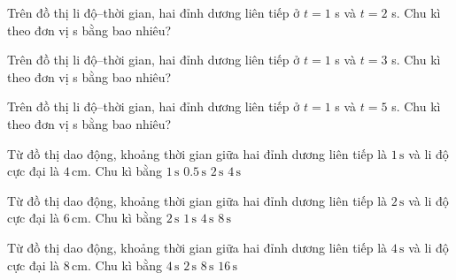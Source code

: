 \begin{ex}
Trên đồ thị li độ–thời gian, hai đỉnh dương liên tiếp ở $t=1$ s và $t=2$ s. Chu kì theo đơn vị s bằng bao nhiêu?
\end{ex}

\begin{ex}
Trên đồ thị li độ–thời gian, hai đỉnh dương liên tiếp ở $t=1$ s và $t=3$ s. Chu kì theo đơn vị s bằng bao nhiêu?
\end{ex}

\begin{ex}
Trên đồ thị li độ–thời gian, hai đỉnh dương liên tiếp ở $t=1$ s và $t=5$ s. Chu kì theo đơn vị s bằng bao nhiêu?
\end{ex}

\begin{ex}
Từ đồ thị dao động, khoảng thời gian giữa hai đỉnh dương liên tiếp là $1\,\text{s}$ và li độ cực đại là $4\,\text{cm}$. Chu kì bằng
\choice
{\True $1\,\text{s}$}
{$0.5\,\text{s}$}
{$2\,\text{s}$}
{$4\,\text{s}$}
\end{ex}

\begin{ex}
Từ đồ thị dao động, khoảng thời gian giữa hai đỉnh dương liên tiếp là $2\,\text{s}$ và li độ cực đại là $6\,\text{cm}$. Chu kì bằng
\choice
{\True $2\,\text{s}$}
{$1\,\text{s}$}
{$4\,\text{s}$}
{$8\,\text{s}$}
\end{ex}

\begin{ex}
Từ đồ thị dao động, khoảng thời gian giữa hai đỉnh dương liên tiếp là $4\,\text{s}$ và li độ cực đại là $8\,\text{cm}$. Chu kì bằng
\choice
{\True $4\,\text{s}$}
{$2\,\text{s}$}
{$8\,\text{s}$}
{$16\,\text{s}$}
\end{ex}
